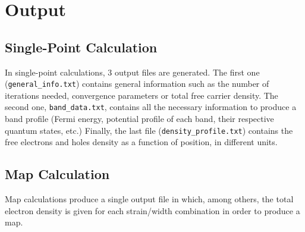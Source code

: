 \documentclass[a4paper,12pt]{article}
\begin{document}
\section{Output}

\subsection{Single-Point Calculation}
In single-point calculations, 3 output files are generated. The first  one (\texttt{general\_info.txt}) contains general information such as the number of iterations needed, convergence parameters or total free carrier density. The second one, \texttt{band\_data.txt}, contains all the necessary information to produce a band profile (Fermi energy, potential profile of each band, their respective quantum states, etc.) Finally, the last file (\texttt{density\_profile.txt}) contains the free electrons and holes density as a function of position, in different units.



\subsection{Map Calculation}
Map calculations produce a single output file in which, among others, the total electron density is given for each strain/width combination in order to produce a map.
\end{document}
